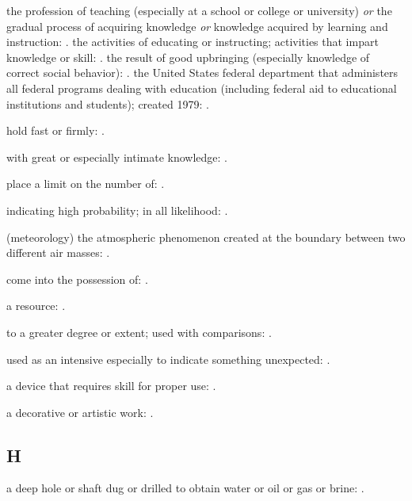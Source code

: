   the profession of teaching (especially at a school or college or university) \textit{or} the gradual process of acquiring knowledge \textit{or} knowledge acquired by learning and instruction: . the activities of educating or instructing; activities that impart knowledge or skill:   . the result of good upbringing (especially knowledge of correct social behavior):   . the United States federal department that administers all federal programs dealing with education (including federal aid to educational institutions and students); created 1979:   .

  hold fast or firmly: .

  with great or especially intimate knowledge:   .

  place a limit on the number of:   .

  indicating high probability; in all likelihood:   .

  (meteorology) the atmospheric phenomenon created at the boundary between two different air masses: .

  come into the possession of:   .

  a resource:   .

  to a greater degree or extent; used with comparisons:   .

  used as an intensive especially to indicate something unexpected: .

  a device that requires skill for proper use: .

  a decorative or artistic work:   .

\subsection*{H}

  a deep hole or shaft dug or drilled to obtain water or oil or gas or brine: .


